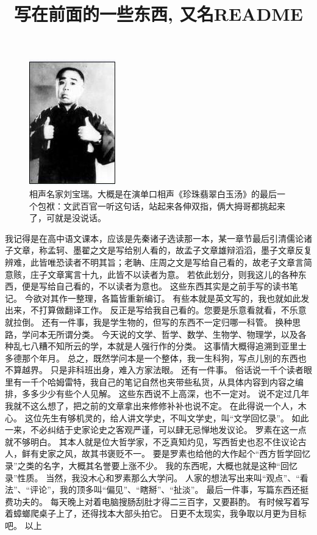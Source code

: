 \documentclass{article}
\title{写在前面的一些东西, 又名README}
\date{}
\begin{document}
\maketitle

\begin{figure}
  \centering
  \includegraphics{Figures/刘宝瑞.jpg}
  \caption{相声名家刘宝瑞。大概是在演单口相声《珍珠翡翠白玉汤》的最后一个包袱：文武百官一听这句话，站起来各伸双指，俩大拇哥都挑起来了，可就是没说话。}
\end{figure}
  
  \newpage
  \linenumbers

我记得是在高中语文课本，应该是先秦诸子选读那一本，某一章节最后引清儒论诸子文章，称孟轲、墨翟之文是写给别人看的，故孟子文章雄辩滔滔，墨子文章反复辨难，此皆唯恐读者不明其旨；老聃、庄周之文是写给自己看的，故老子文章言简意赅，庄子文章寓言十九，此皆不以读者为意。
若依此划分，则我这儿的各种东西，便是写给自己看的，不以读者为意也。
\newline
这些东西其实是之前手写的读书笔记。
今欲对其作一整理，各篇皆重新编订。
有些本就是英文写的，我也就如此发出来，不打算做翻译工作。
反正是写给我自己看的。您要是乐意看就看，不乐意就拉倒。
\newline
还有一件事，我是学生物的，但写的东西不一定归哪一科管。
换种思路，学问本无所谓分类。
今天说的文学、哲学、数学、生物学、物理学，以及各种乱七八糟不知所云的学，本就是人强行作的分类。
这事情大概得追溯到亚里士多德那个年月。
总之，既然学问本是一个整体，我一生科狗，写点儿别的东西也不算越界。
只是非科班出身，难入方家法眼。
\newline
还有一件事。
俗话说一千个读者眼里有一千个哈姆雷特，我自己的笔记自然也夹带些私货，从具体内容到内容之编排，多多少少有些个人见解。
这些东西说不上高深，也不一定对。
说不定过几年我就不这么想了，把之前的文章拿出来修修补补也说不定。
在此得说一个人，木心。
这位先生有够机灵的，给人讲文学史，不叫文学史，叫“文学回忆录”。
如此一来，不必纠结于史家论史之客观严谨，可以肆无忌惮地发议论。
罗素在这一点就不够明白。
其本人就是位大哲学家，不乏真知灼见，写西哲史也忍不住议论古人，鲜有史家之风，故其书褒贬不一。
要是罗素也给他的大作起个“西方哲学回忆录”之类的名字，大概其名誉要上涨不少。
我的东西呢，大概也就是这种“回忆录”性质。
当然，我没木心和罗素那么大学问。
人家的想法写出来叫“观点”、“看法”、“评论”，我的顶多叫“偏见”、“瞎掰”、“扯淡”。
\newline
最后一件事，写篇东西还挺费功夫的。
每天晚上对着电脑搜肠刮肚才得二三百字，又要斟酌。
有时候写着写着蟑螂爬桌子上了，还得找本大部头拍它。
日更不太现实，我争取以月更为目标吧。
\newline
以上    
\end{document}
